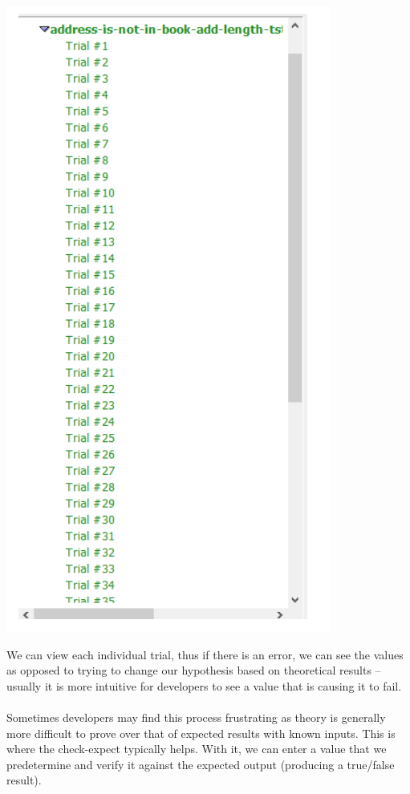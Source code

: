 \documentclass[11pt, letterpaper]{report}
\begin{document}
\begin{description}
\begin{center}
\includegraphics[scale=0.3]{rst}
\end{center}
We can view each individual trial, thus if there is an error, we can see the values as opposed to trying to change our hypothesis based on theoretical results – usually it is more intuitive for developers to see a value that is causing it to fail.\\ \\
Sometimes developers may find this process frustrating as theory is generally more difficult to prove over that of expected results with known inputs.  This is where the check-expect typically helps.  With it, we can enter a value that we predetermine and verify it against the expected output (producing a true/false result).\\\\

\end{description}
\end{document}
